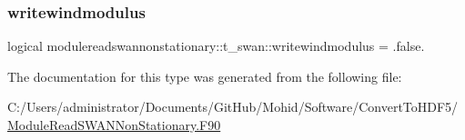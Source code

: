\subsubsection{\texorpdfstring{writewindmodulus}{writewindmodulus}}
{\footnotesize\ttfamily logical modulereadswannonstationary\+::t\+\_\+swan\+::writewindmodulus = .false.\hspace{0.3cm}{\ttfamily [private]}}



The documentation for this type was generated from the following file\+:\begin{DoxyCompactItemize}
\item 
C\+:/\+Users/administrator/\+Documents/\+Git\+Hub/\+Mohid/\+Software/\+Convert\+To\+H\+D\+F5/\mbox{\hyperlink{_module_read_s_w_a_n_non_stationary_8_f90}{Module\+Read\+S\+W\+A\+N\+Non\+Stationary.\+F90}}\end{DoxyCompactItemize}
